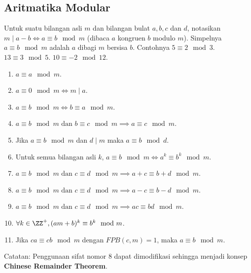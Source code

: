 \subsection{Aritmatika Modular}
    Untuk suatu bilangan asli $m$ dan bilangan bulat $a,b,c$ dan $d$, notasikan $m\mid a-b \iff a \equiv b \mod m$ (dibaca $a$ kongruen $b$ modulo $m$). Simpelnya $a \equiv b \mod m$ adalah $a$ dibagi $m$ bersisa $b$. Contohnya $5 \equiv 2 \mod 3$. $13 \equiv 3 \mod 5$. $10 \equiv -2 \mod 12$.
    \begin{enumerate}
        \item $a \equiv a \mod m$.
        \item $a \equiv 0 \mod m \iff m\mid a$.
        \item $a \equiv b \mod m \iff b \equiv a \mod m$.
        \item $a \equiv b \mod m \text{ dan } b \equiv c \mod m \implies a \equiv c \mod m$.
        \item Jika $a \equiv b \mod m$ dan $d\mid m$ maka $a \equiv b \mod d$.
        \item Untuk semua bilangan asli $k$, $a \equiv b \mod m \iff a^k \equiv b^k \mod m$.
        \item $a \equiv b \mod m \text{ dan } c \equiv d \mod m \implies a+c \equiv b+d \mod m$.
        \item $a \equiv b \mod m \text{ dan } c \equiv d \mod m \implies a-c \equiv b-d \mod m$.
        \item $a \equiv b \mod m \text{ dan } c \equiv d \mod m \implies ac \equiv bd \mod m$.
        \item $\forall k\in \ZZ^+, (am+b)^k \equiv b^k \mod m$.
        \item Jika $ca \equiv cb \mod m$ dengan $FPB(c,m)=1$, maka $a \equiv b \mod m$.
    \end{enumerate}
    
    Catatan: Penggunaan sifat nomor 8 dapat dimodifikasi sehingga menjadi konsep \textbf{Chinese Remainder Theorem}.

